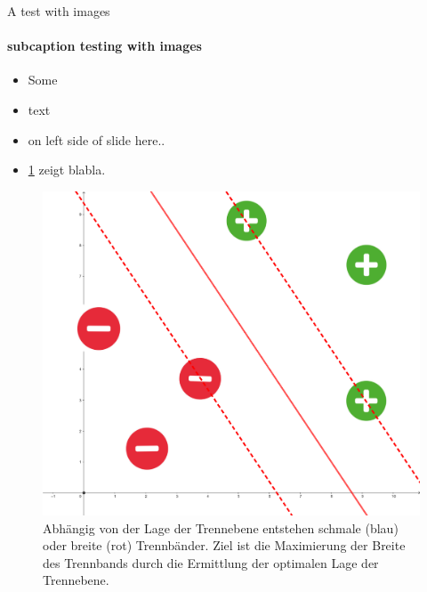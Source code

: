 \documentclass[ngerman]{beamer}
\begin{document}
\begin{frame} {A test with images}
	\framesubtitle{subcaption testing with images}
	\begin{minipage}{0.5\textwidth}

		\begin{itemize}
			\item Some 
			\item text 
			\item on left side of slide here..
			\item \cref{fig:intuition_margin} zeigt blabla.
		\end{itemize}
		\pause
	\end{minipage} \hfill
	\begin{minipage}{0.45\textwidth}
	\begin{figure}
		\centering
		\includegraphics[height=0.9\textwidth]{assets/intuition_big_margin.png}
		\caption{Abhängig von der Lage der Trennebene entstehen schmale (blau) oder breite (rot) Trennbänder. Ziel ist die Maximierung der Breite des Trennbands durch die Ermittlung der optimalen Lage der Trennebene.}
		\label{fig:intuition_margin}
	\end{figure}
	\end{minipage}
\end{frame}
\end{document}

